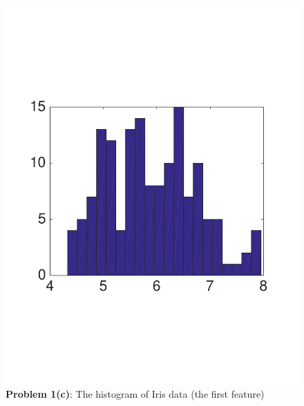 \documentclass[twoside,11pt]{article}
\theoremstyle{definition}
\begin{document}
\begin{figure}[htbp]
   \centering
   \includegraphics[width = .5\textwidth]{figures/hist_iris.pdf} %
   \caption{\textbf{Problem 1(c)}: The histogram of Iris data (the first feature)}
   \label{fig:hist_plot}
\end{figure}
\end{document}
